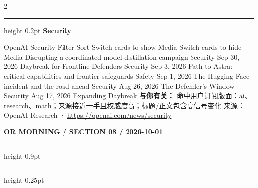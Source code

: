 \documentclass[10.5pt]{ctexart}
\begin{document}
\begin{multicols}{2}
\vspace{2mm}
\hrule height 0.2pt
\vspace{2mm}
{\large\bfseries Security}\par
OpenAI Security Filter Sort Switch cards to show Media Switch cards to hide Media Disrupting a coordinated model-distillation campaign Security Sep 30, 2026 Daybreak for Frontline Defenders Security Sep 3, 2026 Path to Astra: critical capabilities and frontier safeguards Safety Sep 1, 2026 The Hugging Face incident and the road ahead Security Aug 26, 2026 The Defender’s Window Security Aug 17, 2026 Expanding Daybreak
\textbf{与你有关：} 命中用户订阅版面：ai、research、math；来源接近一手且权威度高；标题/正文包含高信号变化
{\footnotesize\color{ormuted} 来源：OpenAI Research · \url{https://openai.com/news/security}}
\end{multicols}
\newpage
{\small\bfseries OR MORNING / SECTION 08 / 2026-10-01}
\vspace{2mm}
\hrule height 0.9pt
\vspace{1.5mm}
\hrule height 0.25pt
\vspace{4mm}
\end{document}
